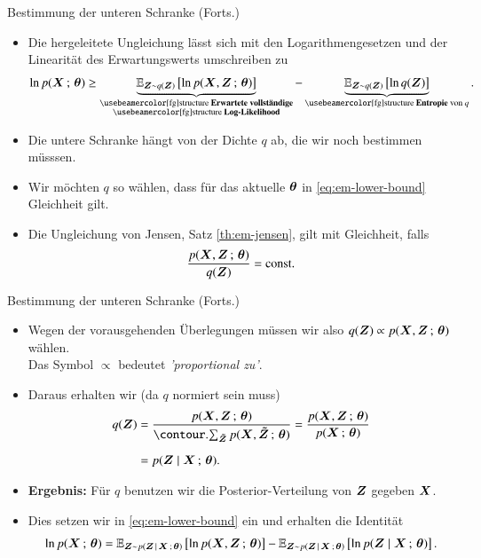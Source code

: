 \begin{frame}{Bestimmung der unteren Schranke (Forts.)}{}
	\begin{itemize}
		\item Die hergeleitete Ungleichung lässt sich mit den Logarithmengesetzen und der Linearität des Erwartungswerts umschreiben zu
		\begin{equation} \label{eq:em-lower-bound}
			\ln p(\bX \param \btheta) \ge \underbrace{
				\E_{\bZ \sim q(\bZ)}\left[ \ln p(\bX, \bZ \param \btheta) \right]
			}_{\substack{\text{\keyword{Erwartete vollständige}} \\ \text{\keyword{Log-Likelihood}}}} - 
			\underbrace{
				\E_{\bZ \sim q(\bZ)}\left[ \ln q(\bZ) \right]
			}_{\text{\keyword{Entropie} von $q$}}.
		\end{equation}
		\item Die untere Schranke hängt von der Dichte $q$ ab, die wir noch bestimmen müsssen.
		\item Wir möchten $q$ so wählen, dass für das aktuelle $\bm{\theta}$ in \eqref{eq:em-lower-bound} Gleichheit gilt.
		\item Die Ungleichung von Jensen, Satz \ref{th:em-jensen}, gilt mit Gleichheit, falls
		\begin{equation*}
			\frac{p(\bm{X}, \bm{Z} \,;\, \bm{\theta})}{q(\bm{Z})} = \text{const}.
		\end{equation*}
	\end{itemize}
\end{frame}


\begin{frame}{Bestimmung der unteren Schranke (Forts.)}{}
	\begin{itemize}
		\item Wegen der vorausgehenden Überlegungen müssen wir also $q(\bm{Z}) \propto p(\bm{X}, \bm{Z} \,;\, \bm{\theta})$ wählen. \\
			Das Symbol $\propto$ bedeutet \textit{'proportional zu'}.
		\item Daraus erhalten wir (da $q$ normiert sein muss)
		\begin{align*}
			q(\bZ)
				&= \frac{p(\bX, \bZ \param \btheta)}{\sum_{\bZtilde} p(\bX, \bZtilde \param \btheta)}
					= \frac{p(\bX, \bZ \param \btheta)}{p(\bX \param \btheta)}
		\\[2mm]
				&= p(\bZ \mid \bX \param \btheta).
		\end{align*}
		\item \textbf{Ergebnis:} Für $q$ benutzen wir die Posterior-Verteilung von $\bm{Z}$ gegeben $\bm{X}$.
		\item Dies setzen wir in \eqref{eq:em-lower-bound} ein und erhalten die Identität
		\begin{equation*}
			\ln p(\bm{X} \,;\, \bm{\theta}) = \mathbb{E}_{\bm{Z} \sim p(\bm{Z}\,\mid\,\bm{X} \,;\, \bm{\theta})}\left[ \ln p(\bm{X}, \bm{Z} \,;\, \bm{\theta}) \right]
				- \mathbb{E}_{\bm{Z} \sim p(\bm{Z}\,\mid\,\bm{X} \,;\, \bm{\theta})}\left[ \ln p(\bm{Z} \mid \bm{X} \,;\, \bm{\theta}) \right].
		\end{equation*}
	\end{itemize}
\end{frame}



